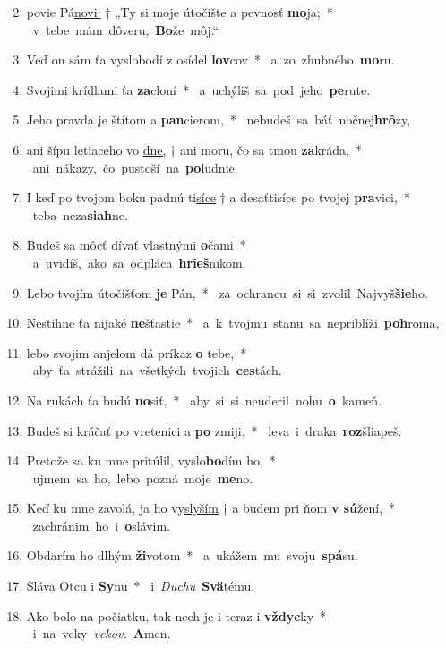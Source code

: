 \begin{flushleft}
\begin{enumerate}[leftmargin=*]
\setcounter{enumi}{1}
\item povie Pá\underline{novi:} † „Ty si moje útočište a pevnosť \textbf{mo}ja;~* \mbox{ v tebe mám dôveru, \textbf{Bo}že môj.“}
\item Veď on sám ťa vyslobodí z osídel \textbf{lov}cov~* \mbox{ a zo zhubného \textbf{mo}ru.}
\item Svojimi krídlami ťa \textbf{za}cloní~* \mbox{ a uchýliš sa pod jeho \textbf{pe}rute.}
\item Jeho pravda je štítom a \textbf{pan}cierom,~* \mbox{ nebudeš sa báť nočnej\textbf{hrô}zy,}
\item ani šípu letiaceho vo \underline{dne,} † ani moru, čo sa tmou \textbf{za}kráda,~* \mbox{ ani nákazy, čo pustoší na \textbf{po}ludnie.}
\item I keď po tvojom boku padnú ti\underline{síce} † a desaťtisíce po tvojej \textbf{pra}vici,~* \mbox{ teba neza\textbf{siah}ne.}
\item Budeš sa môcť dívať vlastnými \textbf{o}čami~* \mbox{ a uvidíš, ako sa odpláca \textbf{hrieš}nikom.}
\item Lebo tvojím útočišťom \textbf{je} Pán,~* \mbox{ za ochrancu si si zvolil Najvyš\textbf{šie}ho.}
\item Nestihne ťa nijaké \textbf{ne}šťastie~* \mbox{ a k tvojmu stanu sa nepriblíži \textbf{poh}roma,}
\item lebo svojim anjelom dá príkaz \textbf{o} tebe,~* \mbox{ aby ťa strážili na všetkých tvojich \textbf{ces}tách.}
\item Na rukách ťa budú \textbf{no}siť,~* \mbox{ aby si si neuderil nohu \textbf{o} kameň.}
\item Budeš si kráčať po vretenici a \textbf{po} zmiji,~* \mbox{ leva i draka \textbf{roz}šliapeš.}
\item Pretože sa ku mne pritúlil, vyslo\textbf{bo}dím ho,~* \mbox{ ujmem sa ho, lebo pozná moje \textbf{me}no.}
\item Keď ku mne zavolá, ja ho vy\underline{slyším} † a budem pri ňom \textbf{v sú}žení,~* \mbox{ zachránim ho i \textbf{o}slávim.}
\item Obdarím ho dlhým \textbf{ži}votom~* \mbox{ a ukážem mu svoju \textbf{spá}su.}
\item Sláva Otcu i \textbf{Sy}nu~* \mbox{ i {\it Duchu} \textbf{Svä}tému.}
\item Ako bolo na počiatku, tak nech je i teraz i \textbf{vždyc}ky~* \mbox{ i na veky {\it vekov.} \textbf{A}men.}\end{enumerate}
\end{flushleft}

